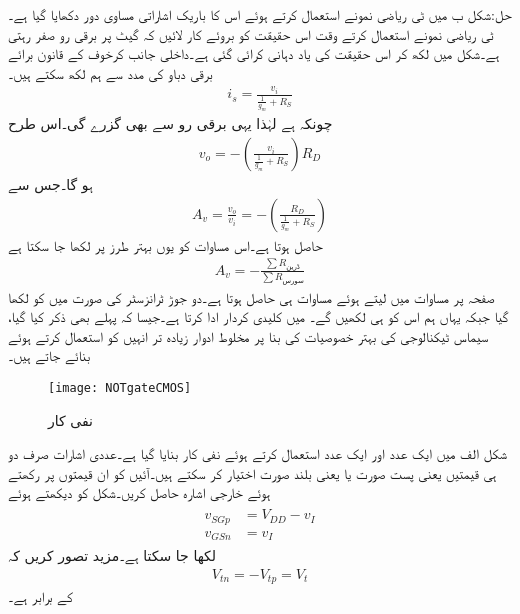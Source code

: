حل:شکل  ب میں ٹی ریاضی نمونے استعمال کرتے ہوئے اس کا باریک اشاراتی مساوی دور دکھایا گیا ہے۔ٹی ریاضی نمونے استعمال کرتے وقت اس حقیقت کو بروئے کار لائیں کہ گیٹ پر برقی رو صفر رہتی ہے۔شکل میں  لکھ کر اس حقیقت کی یاد دہانی کرائی گئی ہے۔داخلی جانب کرخوف کے قانون برائے برقی دباو کی مدد سے ہم لکھ سکتے ہیں۔
\begin{align*}
i_s=\frac{v_i}{\frac{1}{g_m}+R_S}
\end{align*}
چونکہ  ہے لہٰذا یہی برقی رو  سے بھی گزرے گی۔اس طرح
\begin{align*}
v_o=-\left(\frac{v_i}{\frac{1}{g_m}+R_S} \right) R_D
\end{align*}
ہو گا۔جس سے
\begin{align}
A_v=\frac{v_o}{v_i}=-\left(\frac{R_D}{\frac{1}{g_m}+R_S} \right) 
\end{align}
حاصل ہوتا ہے۔اس مساوات کو یوں بہتر طرز پر لکھا جا سکتا ہے
\begin{align}\label{مساوات_ماسفیٹ_افزائش_بطور_مزاحت_کی_شرح}
A_v=-\frac{\sum R_{\textrm{ڈرین}}}{\sum R_{\textrm{سورس}}}
\end{align}
صفحہ  پر مساوات  میں  لیتے ہوئے مساوات  ہی حاصل ہوتا ہے۔دو جوڑ ٹرانزسٹر کی صورت میں  کو  لکھا گیا جبکہ یہاں  ہم اس کو  ہی لکھیں گے۔
 میں  کلیدی کردار ادا کرتا ہے۔جیسا کہ پہلے بھی ذکر کیا گیا، سیماس ٹیکنالوجی کی بہتر خصوصیات کی بنا پر مخلوط ادوار زیادہ تر انہیں کو استعمال کرتے ہوئے بنائے جاتے ہیں۔ 
\begin{figure}
\centering
\texttt{[image: NOTgateCMOS]}
\caption{نفی کار}
\label{شکل_ماسفیٹ_نفی_کار_الف}
\end{figure}

شکل   الف میں ایک عدد  اور ایک عدد  استعمال کرتے ہوئے  نفی کار بنایا گیا ہے۔عددی اشارات صرف دو ہی قیمتیں  یعنی پست صورت  یا  یعنی بلند صورت اختیار کر سکتے ہیں۔آئیں  کو ان قیمتوں پر رکھتے ہوئے خارجی اشارہ  حاصل کریں۔شکل کو دیکھتے ہوئے
\begin{gather}
\begin{aligned}\label{مساوات_ماسفیٹ_ناٹ_گیٹ_الف}
v_{SGp}&=V_{DD}-v_I\\
v_{GSn}&=v_I
\end{aligned}
\end{gather}
لکھا جا سکتا ہے۔مزید تصور کریں کہ 
\begin{align}
V_{tn}=-V_{tp}=V_t
\end{align}
کے برابر ہے۔

